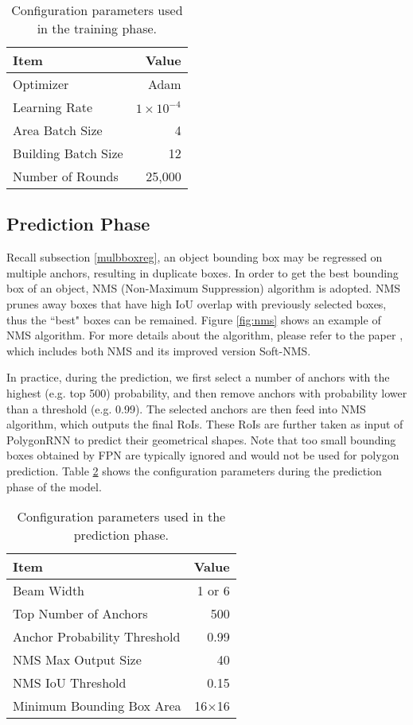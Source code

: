 \begin{table}[!h]
	\centering
	\caption[Configuration parameters used in the training phase]{Configuration parameters used in the training phase.}
	\label{tab:trnphs}
	\begin{tabular}{l|r}
	\hline
	\textbf{Item} & \textbf{Value} \\
	\hline
	Optimizer & Adam \\
	Learning Rate & $1\times10^{-4}$ \\
	Area Batch Size & 4 \\
	Building Batch Size & 12 \\
	Number of Rounds & 25,000 \\
	\hline
	\end{tabular}
\end{table}

\subsection{Prediction Phase}\label{prdphs}
Recall subsection \ref{mulbboxreg}, an object bounding box may be regressed on multiple anchors, resulting in duplicate boxes. In order to get the best bounding box of an object, NMS (Non-Maximum Suppression) algorithm is adopted. NMS prunes away boxes that have high IoU overlap with previously selected boxes, thus the ``best" boxes can be remained. Figure \ref{fig:nms} shows an example of NMS algorithm. For more details about the algorithm, please refer to the paper \cite{softnms}, which includes both NMS and its improved version Soft-NMS.


In practice, during the prediction, we first select a number of anchors with the highest (e.g. top 500) probability, and then remove anchors with probability lower than a threshold (e.g. 0.99). The selected anchors are then feed into NMS algorithm, which outputs the final RoIs. These RoIs are further taken as input of PolygonRNN to predict their geometrical shapes. Note that too small bounding boxes obtained by FPN are typically ignored and would not be used for polygon prediction. Table \ref{tab:prdphs} shows the configuration parameters during the prediction phase of the model.
\begin{table}[!h]
	\centering
	\caption[Configuration parameters used in the prediction phase]{Configuration parameters used in the prediction phase.}
	\label{tab:prdphs}
	\begin{tabular}{l|r}
	\hline
	\textbf{Item} & \textbf{Value} \\
	\hline
	Beam Width & 1 or 6 \\
	Top Number of Anchors & 500 \\
	Anchor Probability Threshold & 0.99 \\
	NMS Max Output Size & 40 \\
	NMS IoU Threshold & 0.15 \\
	Minimum Bounding Box Area & 16$\times$16 \\
	\hline
	\end{tabular}
\end{table}

